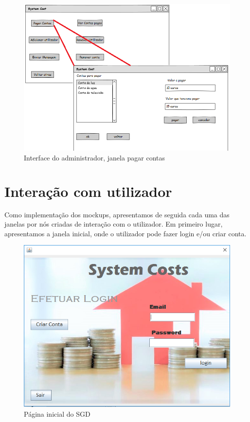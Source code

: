 \begin{figure}[h!]
	\centering
	\includegraphics[scale=0.6]{imagens/mockups/AdminpagarContas}  
	\caption{Interface do administrador, janela pagar contas }  
\end{figure}

\newpage

\section{Interação com utilizador}

Como implementação dos mockups, apresentamos de seguida cada uma das janelas por nós criadas de interação com o utilizador.
Em primeiro lugar, apresentamos a janela inicial, onde o utilizador pode fazer login e/ou criar conta. 

\begin{figure}[h!]
	\centering
	\includegraphics[scale=0.6]{imagens/interface/inicial}  
	\caption{Página inicial do SGD }  
\end{figure}


